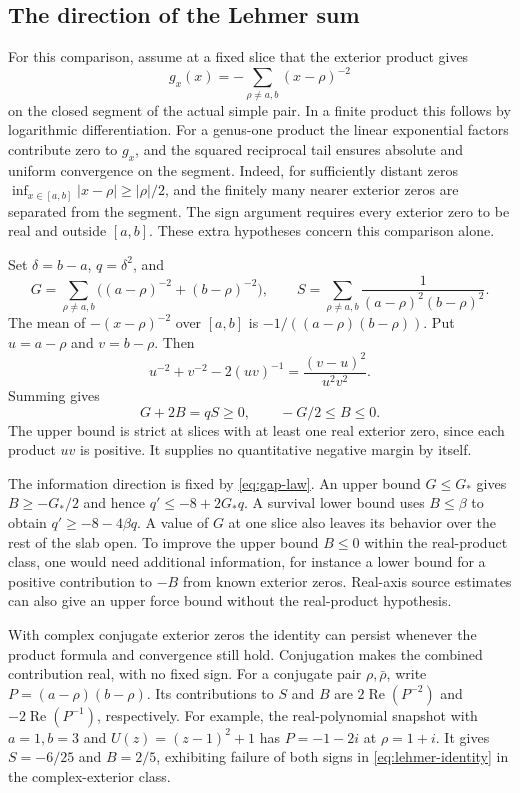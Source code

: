 \subsection{The direction of the Lehmer sum}

For this comparison, assume at a fixed slice that the exterior
product gives
\[
 g_x(x)=-\sum_{\rho\ne a,b}(x-\rho)^{-2}
\]
on the closed segment of the actual simple pair. In a finite product
this follows by logarithmic differentiation. For a genus-one product
the linear exponential factors contribute zero to \(g_x\), and the
squared reciprocal tail ensures absolute and uniform convergence on
the segment. Indeed, for sufficiently distant zeros
\(\inf_{x\in[a,b]}|x-\rho|\ge|\rho|/2\), and the finitely many nearer
exterior zeros are separated from the segment. The sign argument
requires every exterior zero to be real and outside \([a,b]\).
These extra hypotheses concern this comparison alone.

Set \(\delta=b-a\), \(q=\delta^2\), and
\[
 G=\sum_{\rho\ne a,b}
      \bigl((a-\rho)^{-2}+(b-\rho)^{-2}\bigr),
 \qquad
 S=\sum_{\rho\ne a,b}\frac{1}{(a-\rho)^2(b-\rho)^2}.
\]
The mean of \(-(x-\rho)^{-2}\) over \([a,b]\) is
\(-1/((a-\rho)(b-\rho))\). Put \(u=a-\rho\) and \(v=b-\rho\).
Then
\[
 u^{-2}+v^{-2}-2(uv)^{-1}
     =\frac{(v-u)^2}{u^2v^2}.
\]
Summing gives
\begin{equation}
 G+2B=qS\ge0,\qquad -G/2\le B\le0.
 \label{eq:lehmer-identity}
\end{equation}
The upper bound is strict at slices with at least one real exterior
zero, since each product \(uv\) is positive. It supplies no
quantitative negative margin by itself.

The information direction is fixed by \eqref{eq:gap-law}.
An upper bound \(G\le G_*\) gives \(B\ge-G_*/2\) and hence
\(q'\le-8+2G_*q\). A survival lower bound uses \(B\le\beta\)
to obtain \(q'\ge-8-4\beta q\). A value of \(G\) at one slice
also leaves its behavior over the rest of the slab open. To
improve the upper bound \(B\le0\) within the real-product class,
one would need additional information, for instance a lower
bound for a positive contribution to \(-B\) from known exterior
zeros. Real-axis source estimates can also give an upper force
bound without the real-product hypothesis.

With complex conjugate exterior zeros the identity can persist
whenever the product formula and convergence still hold. Conjugation
makes the combined contribution real, with no fixed sign. For a conjugate pair
\(\rho,\bar\rho\), write \(P=(a-\rho)(b-\rho)\). Its contributions
to \(S\) and \(B\) are \(2\operatorname{Re}(P^{-2})\) and
\(-2\operatorname{Re}(P^{-1})\), respectively. For example, the
real-polynomial snapshot with \(a=1,b=3\) and
\(U(z)=(z-1)^2+1\) has \(P=-1-2i\) at \(\rho=1+i\).
It gives \(S=-6/25\) and \(B=2/5\), exhibiting failure of
both signs in \eqref{eq:lehmer-identity} in the complex-exterior
class.

